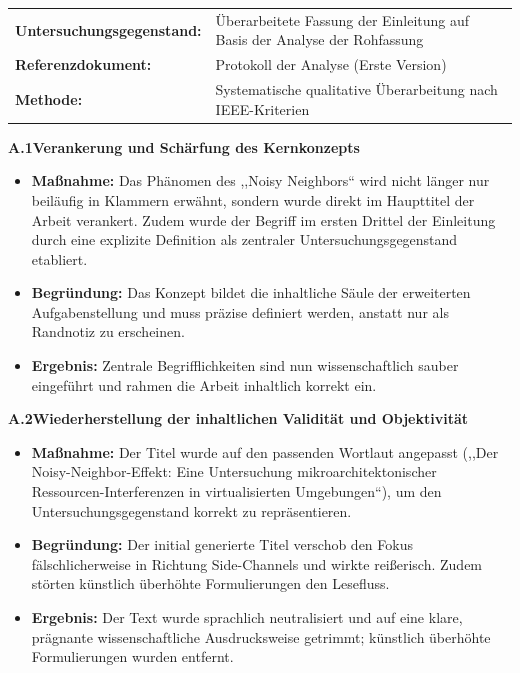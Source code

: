 \documentclass[conference]{IEEEtran}
\begin{document}
\noindent
\begin{tabular}{@{}ll@{}}
  \textbf{Untersuchungsgegenstand:} &
    Überarbeitete Fassung der Einleitung auf Basis der Analyse der Rohfassung \\
  \textbf{Referenzdokument:}        &
    Protokoll der Analyse (Erste Version) \\
  \textbf{Methode:}                 &
    Systematische qualitative Überarbeitung nach IEEE-Kriterien \\
\end{tabular}

\bigskip
\noindent\textbf{A.1\quad Verankerung und Schärfung des Kernkonzepts}

\begin{itemize}
  \item \textbf{Maßnahme:} Das Phänomen des ,,Noisy Neighbors`` wird nicht
        länger nur beiläufig in Klammern erwähnt, sondern wurde direkt im
        Haupttitel der Arbeit verankert. Zudem wurde der Begriff im ersten
        Drittel der Einleitung durch eine explizite Definition als zentraler
        Untersuchungsgegenstand etabliert.
  \item \textbf{Begründung:} Das Konzept bildet die inhaltliche Säule der
        erweiterten Aufgabenstellung und muss präzise definiert werden,
        anstatt nur als Randnotiz zu erscheinen.
  \item \textbf{Ergebnis:} Zentrale Begrifflichkeiten sind nun
        wissenschaftlich sauber eingeführt und rahmen die Arbeit inhaltlich
        korrekt ein.
\end{itemize}

\bigskip
\noindent\textbf{A.2\quad Wiederherstellung der inhaltlichen Validität und
Objektivität}

\begin{itemize}
  \item \textbf{Maßnahme:} Der Titel wurde auf den passenden Wortlaut
        angepasst (,,Der Noisy-Neighbor-Effekt: Eine Untersuchung
        mikroarchitektonischer Ressourcen-Interferenzen in virtualisierten
        Umgebungen``), um den Untersuchungsgegenstand korrekt zu
        repräsentieren.
  \item \textbf{Begründung:} Der initial generierte Titel verschob den Fokus
        fälschlicherweise in Richtung Side-Channels und wirkte reißerisch.
        Zudem störten künstlich überhöhte Formulierungen den Lesefluss.
  \item \textbf{Ergebnis:} Der Text wurde sprachlich neutralisiert und auf
        eine klare, prägnante wissenschaftliche Ausdrucksweise getrimmt;
        künstlich überhöhte Formulierungen wurden entfernt.
\end{itemize}
\end{document}
